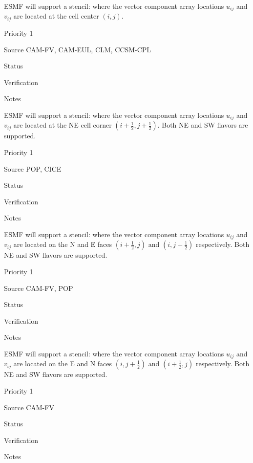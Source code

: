 \sreq{\agrid}

ESMF will support a \agrid stencil: where the vector
component array locations $u_{ij}$ and $v_{ij}$ are located at the
cell center $(i,j)$.

\begin{reqlist}
\item[Priority] 1
\item[Source] CAM-FV, CAM-EUL, CLM, CCSM-CPL
\item[Status]
\item[Verification]
\item[Notes]
\end{reqlist}

\sreq{\bgrid}

ESMF will support a \bgrid stencil: where the vector component array
locations $u_{ij}$ and $v_{ij}$ are located at the NE cell corner
$(i+\frac12,j+\frac12)$. Both NE and SW flavors are supported.

\begin{reqlist}
\item[Priority] 1
\item[Source] POP, CICE
\item[Status]
\item[Verification]
\item[Notes]
\end{reqlist}

\sreq{\cgrid}

ESMF will support a \cgrid stencil: where the vector component array
locations $u_{ij}$ and $v_{ij}$ are located on the N and E faces
$(i+\frac12,j)$ and $(i,j+\frac12)$ respectively. Both NE and SW
flavors are supported.

\begin{reqlist}
\item[Priority] 1
\item[Source] CAM-FV, POP
\item[Status]
\item[Verification]
\item[Notes]
\end{reqlist}

\sreq{\dgrid}

ESMF will support a \dgrid stencil: where the vector component array
locations $u_{ij}$ and $v_{ij}$ are located on the E and N faces
$(i,j+\frac12)$ and $(i+\frac12,j)$ respectively. Both NE and SW
flavors are supported.

\begin{reqlist}
\item[Priority] 1
\item[Source] CAM-FV
\item[Status]
\item[Verification]
\item[Notes]
\end{reqlist}

